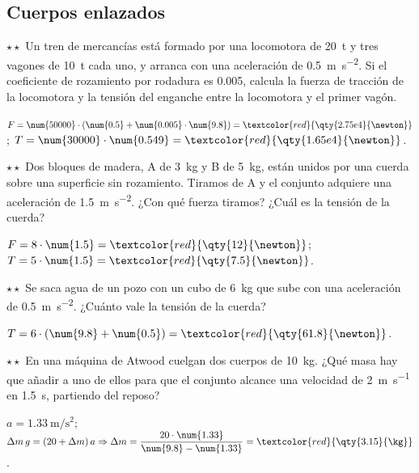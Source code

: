 \subsection{Cuerpos enlazados}

\begin{exercise}
    \(\star\star\) Un tren de mercancías está formado por una locomotora de \qty{20}{t} y tres vagones de \qty{10}{t} cada uno, y
    arranca con una aceleración de \qty{0.5}{\m\per\s\squared}. Si el coeficiente de rozamiento por rodadura es \num{0.005}, calcula la
    fuerza de tracción de la locomotora y la tensión del enganche entre la locomotora y el primer vagón.
    \begin{solu}
        \(F = \num{50000} \cdot (\num{0.5} + \num{0.005} \cdot \num{9.8}) = \textcolor{red}{\qty{2.75e4}{\newton}}\);
        \(T = \num{30000} \cdot \num{0.549} = \textcolor{red}{\qty{1.65e4}{\newton}}\).
    \end{solu}
\end{exercise}

\begin{exercise}
    \(\star\star\) Dos bloques de madera, A de \qty{3}{\kg} y B de \qty{5}{\kg}, están unidos por una cuerda sobre una superficie sin
    rozamiento. Tiramos de A y el conjunto adquiere una aceleración de \qty{1.5}{\m\per\s\squared}. ¿Con qué fuerza tiramos? ¿Cuál es la
    tensión de la cuerda?
    \begin{solu}
        \(F = 8 \cdot \num{1.5} = \textcolor{red}{\qty{12}{\newton}}\); \(T = 5 \cdot \num{1.5} = \textcolor{red}{\qty{7.5}{\newton}}\).
    \end{solu}
\end{exercise}

\begin{exercise}
    \(\star\star\) Se saca agua de un pozo con un cubo de \qty{6}{\kg} que sube con una aceleración de \qty{0.5}{\m\per\s\squared}.
    ¿Cuánto vale la tensión de la cuerda?
    \begin{solu}
        \(T = 6 \cdot (\num{9.8} + \num{0.5}) = \textcolor{red}{\qty{61.8}{\newton}}\).
    \end{solu}
\end{exercise}

\begin{exercise}
    \(\star\star\) En una máquina de Atwood cuelgan dos cuerpos de \qty{10}{\kg}. ¿Qué masa hay que añadir a uno de ellos para que el
    conjunto alcance una velocidad de \qty{2}{\m\per\s} en \qty{1.5}{\s}, partiendo del reposo?
    \begin{solu}
        \(a = \qty{1.33}{\m\per\s\squared}\); \(\Delta m\,g = (20 + \Delta m)\,a \Rightarrow \Delta m = \dfrac{20 \cdot \num{1.33}}{\num{9.8} - \num{1.33}}
        = \textcolor{red}{\qty{3.15}{\kg}}\).
    \end{solu}
\end{exercise}

